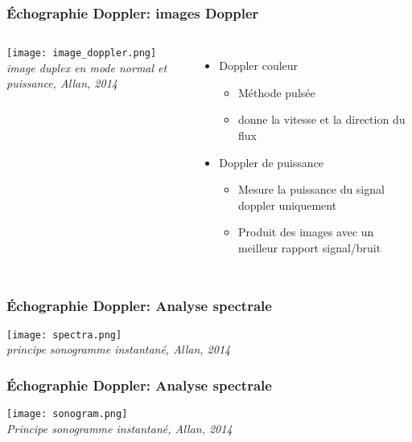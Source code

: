 \documentclass{beamer}
\begin{document}
\begin{frame}
\frametitle{\'Echographie Doppler: images Doppler}
\begin{columns}
\column{60mm}
\begin{center}
\texttt{[image: image\_doppler.png]}\\
\textit{\footnotesize image duplex en mode normal et puissance, Allan, 2014}
\end{center}
\column{60mm}
\begin{itemize}
\item Doppler couleur
\vspace{0.2cm}
\begin{itemize}
\item Méthode pulsée
\vspace{0.2cm}
\item donne la vitesse et la direction du flux
\vspace{0.2cm} 
\end{itemize}
\item Doppler de puissance
\vspace{0.2cm}
\begin{itemize}
\item Mesure la puissance du signal doppler uniquement
\vspace{0.2cm}
\item Produit des images avec un meilleur rapport signal/bruit 
\end{itemize}
\end{itemize}
\end{columns}
\end{frame}

\begin{frame}
\frametitle{\'Echographie Doppler: Analyse spectrale}
\begin{center}
\texttt{[image: spectra.png]}\\
\textit{\footnotesize principe sonogramme instantané, Allan, 2014}
\end{center}
\end{frame}

\begin{frame}
\frametitle{\'Echographie Doppler: Analyse spectrale}
\begin{center}
\texttt{[image: sonogram.png]}\\
\textit{\footnotesize Principe sonogramme instantané, Allan, 2014}
\end{center}
\end{frame}
\end{document}
